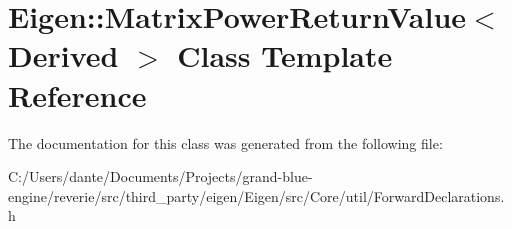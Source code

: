 \hypertarget{class_eigen_1_1_matrix_power_return_value}{}\section{Eigen\+::Matrix\+Power\+Return\+Value$<$ Derived $>$ Class Template Reference}
\label{class_eigen_1_1_matrix_power_return_value}


The documentation for this class was generated from the following file\+:\begin{DoxyCompactItemize}
\item 
C\+:/\+Users/dante/\+Documents/\+Projects/grand-\/blue-\/engine/reverie/src/third\+\_\+party/eigen/\+Eigen/src/\+Core/util/Forward\+Declarations.\+h\end{DoxyCompactItemize}
